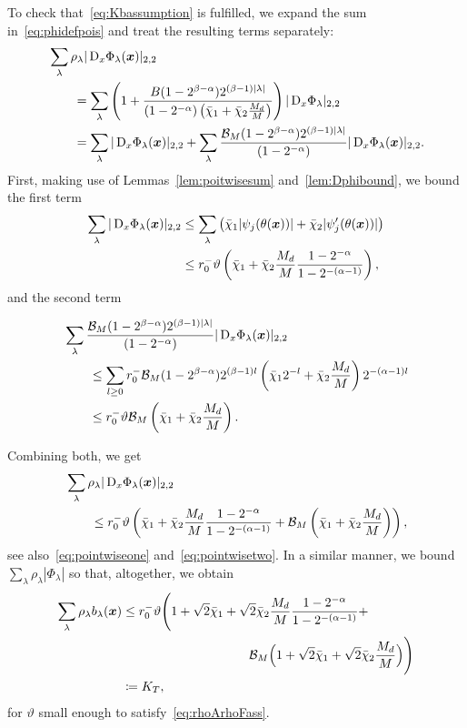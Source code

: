 To check that~\eqref{eq:Kbassumption} is fulfilled, we expand the sum in~\eqref{eq:phidefpois} and treat the resulting terms separately:
\begin{align*}
    &\sum_\lambda \rho_\lambda|\mathop{}\!\mathrm{D}_x\Phi_\lambda({{\bm{x}}})|_{2,2}\\
    &\qquad= \sum_\lambda \left( 1 + \frac{B(1-2^{\beta - \alpha})2^{(\beta - 1)|\lambda|}}{(1-2^{-\alpha})\left(\bar{\chi}_1  + \bar{\chi}_2\frac{M_d}{M}\right)} \right)|\mathop{}\!\mathrm{D}_x\Phi_\lambda|_{2,2}\\
    &\qquad= \sum_\lambda |\mathop{}\!\mathrm{D}_x\Phi_\lambda({{\bm{x}}})|_{2,2} + \sum_\lambda \frac{\mathcal{B}_M(1-2^{\beta - \alpha})2^{(\beta - 1)|\lambda|}}{(1-2^{-\alpha})} |\mathop{}\!\mathrm{D}_x\Phi_\lambda({{\bm{x}}})|_{2,2}.
\end{align*}
First, making use of Lemmas~\ref{lem:poitwisesum} and~\ref{lem:Dphibound}, we bound the first term
\begin{align*}
    \sum_\lambda  |\mathop{}\!\mathrm{D}_x\Phi_\lambda({{\bm{x}}})|_{2,2}&\leq  \sum_\lambda \left(\bar{\chi}_1| \psi_j(\theta({{\bm{x}}})) | + \bar{\chi}_2|  \psi_j'(\theta({{\bm{x}}}))  |\right)\nonumber\\
    &\leq  r_0^-\vartheta \left( \bar{\chi}_1 + \bar{\chi}_2\frac{M_d}{M} \frac{1-2^{-\alpha}}{1-2^{-(\alpha-1)}}    \right),
\end{align*}
and the second term
\begin{revenv}
    \begin{align*}
        &\sum_\lambda   \frac{\mathcal{B}_M(1-2^{\beta - \alpha})2^{(\beta - 1)|\lambda|}}{   (1-2^{-\alpha})} |\mathop{}\!\mathrm{D}_x\Phi_\lambda({{\bm{x}}})|_{2,2}\\
        &\qquad\leq\sum_{l \geq 0} r_0^-\mathcal{B}_M(1-2^{\beta - \alpha})2^{(\beta - 1)l} \left(\bar{\chi}_1 2^{-l} +\bar{\chi}_2 \frac{M_d}{M}\right) 2^{-(\alpha-1) l}\\
        &\qquad\leq r_0^- \vartheta  \mathcal{B}_M \left(\bar{\chi}_1 + \bar{\chi}_2\frac{M_d}{M}\right).
    \end{align*}
\end{revenv}
Combining both, we get
\begin{align*}
    &\sum_\lambda \rho_\lambda|\mathop{}\!\mathrm{D}_x\Phi_\lambda({{\bm{x}}})|_{2,2} \nonumber\\
    &\qquad\leq r_0^-\vartheta \left( \bar{\chi}_1 + \bar{\chi}_2\frac{M_d}{M} \frac{1-2^{-\alpha}}{1-2^{-(\alpha-1)}}  + \mathcal{B}_M\left(\bar{\chi}_1 + \bar{\chi}_2\frac{M_d}{M}\right)  \right),
\end{align*}
see also~\eqref{eq:pointwiseone} and~\eqref{eq:pointwisetwo}.
In a similar manner, we bound $\sum_\lambda \rho_\lambda|\Phi_\lambda|$ so that, altogether, we obtain
\begin{align}
    \sum_{\lambda} \rho_\lambda b_\lambda({{\bm{x}}}) &\leq r_0^-\vartheta \Bigg( 1+ \sqrt{2} \bar{\chi}_1 +  \sqrt{2}\bar{\chi}_2\frac{M_d}{M} \frac{1-2^{-\alpha}}{1-2^{-(\alpha-1)}} + \nonumber\\
    &\qquad\qquad\qquad\qquad\qquad\mathcal{B}_M \Big(1+ \sqrt{2}\bar{\chi}_1 + \sqrt{2}\bar{\chi}_2 \frac{M_d}{M}\Big)  \Bigg)\nonumber\\
    &\coloneqq K_T, \label{eq:endmollifiercalculation}
\end{align}
for $\vartheta$ small enough to satisfy~\eqref{eq:rhoArhoFass}.

